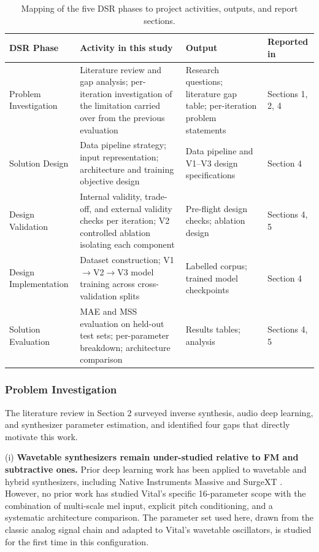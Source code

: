 \begin{table}[H]
\centering
\renewcommand{\arraystretch}{1.4}
\begin{tabular}{p{2.8cm} p{4.8cm} p{3.6cm} p{2.0cm}}
\hline
\textbf{DSR Phase} & \textbf{Activity in this study} & \textbf{Output} & \textbf{Reported in} \\
\hline
Problem Investigation  & Literature review and gap analysis; per-iteration investigation of the limitation carried over from the previous evaluation & Research questions; literature gap table; per-iteration problem statements & Sections 1, 2, 4 \\
Solution Design        & Data pipeline strategy; input representation; architecture and training objective design & Data pipeline and V1--V3 design specifications & Section 4 \\
Design Validation      & Internal validity, trade-off, and external validity checks per iteration; V2 controlled ablation isolating each component & Pre-flight design checks; ablation design & Sections 4, 5 \\
Design Implementation & Dataset construction; V1$\to$V2$\to$V3 model training across cross-validation splits & Labelled corpus; trained model checkpoints & Section 4 \\
Solution Evaluation    & MAE and MSS evaluation on held-out test sets; per-parameter breakdown; architecture comparison & Results tables; analysis & Sections 4, 5 \\
\hline
\end{tabular}
\vspace{0.3cm}
\caption{Mapping of the five DSR phases to project activities, outputs, and report sections.}
\label{tab:dsr_mapping}
\end{table}

\subsubsection{Problem Investigation}

The literature review in Section 2 surveyed inverse synthesis, audio deep learning, and synthesizer parameter estimation, and identified four gaps that directly motivate this work.

\par \vspace{0.3cm}
\noindent (i) \textbf{Wavetable synthesizers remain under-studied relative to FM and subtractive ones.} Prior deep learning work has been applied to wavetable and hybrid synthesizers, including Native Instruments Massive \cite{bruford2024ast} and SurgeXT \cite{hayes2025surgext}. However, no prior work has studied Vital's specific 16-parameter scope with the combination of multi-scale mel input, explicit pitch conditioning, and a systematic architecture comparison. The parameter set used here, drawn from the classic analog signal chain and adapted to Vital's wavetable oscillators, is studied for the first time in this configuration.

